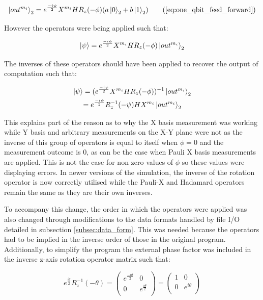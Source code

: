 \begin{equation}
\ket{out^{m_{i}}}_{2} = e^{\frac{-i \psi}{2}} X^{m_{i}} H R_{z} (-\phi) (a \ket{0}_{2} + b \ket{1}_{2})
\tag{\ref{eq:one_qbit_feed_forward}}
\end{equation}

However the operators were being applied such that:

\begin{equation}
\ket{\psi} = e^{\frac{-i \psi}{2}} X^{m_{i}} H R_{z} (-\phi) \ket{out^{m_{i}}}_{2}
\end{equation}

The inverses of these operators should have been applied to recover the output of computation such that:

\begin{multline}
\ket{\psi} = (e^{\frac{-i \psi}{2}} X^{m_{i}} H R_{z} (-\phi))^{-1} \ket{out^{m_{i}}}_{2} \\
= e^{\frac{-i \psi}{2}} R_{z}^{-1} (-\psi) H X^{m_{i}}\ket{out^{m_{i}}}_{2} \\
\end{multline}

This explains part of the reason as to why the X basis measurement was working while Y basis and arbitrary measurements on the X-Y plane were not as the inverse of this group of operators is equal to itself when $\phi = 0$ and the measurement outcome is $0$, as can be the case when Pauli X basis measurements are applied. This is not the case for non zero values of $\phi$ so these values were displaying errors. In newer versions of the simulation, the inverse of the rotation operator is now correctly utilised while the Pauli-X and Hadamard operators remain the same as they are their own inverses.

To accompany this change, the order in which the operators were applied was also changed through modifications to the data formats handled by file I/O detailed in subsection \ref{subsec:data_form}. This was needed because the operators had to be implied in the inverse order of those in the original program. Additionally, to simplify the program the external phase factor was included in the inverse z-axis rotation operator matrix such that:

\begin{equation}
e^{\frac{i \theta}{2}} R_{z}^{-1}(- \theta) = 
\begin{pmatrix}
e^{\frac{- i \theta}{2}} & 0 \\
0 & e^{\frac{i \theta}{2}} \\
\end{pmatrix}
=
\begin{pmatrix}
1 & 0 \\
0 & e^{i \theta} \\
\end{pmatrix}
\end{equation} 

